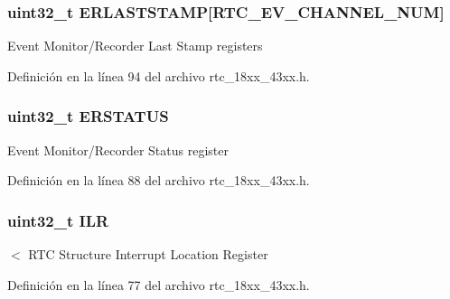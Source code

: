 \subsubsection[{\texorpdfstring{E\+R\+L\+A\+S\+T\+S\+T\+A\+MP}{ERLASTSTAMP}}]{ uint32\+\_\+t E\+R\+L\+A\+S\+T\+S\+T\+A\+MP\mbox{[}{\bf R\+T\+C\+\_\+\+E\+V\+\_\+\+C\+H\+A\+N\+N\+E\+L\+\_\+\+N\+UM}\mbox{]}}\hypertarget{struct_l_p_c___r_t_c___t_a1657c3a94cbbf1c7ecaa11f5ae2cfcc9}{}\label{struct_l_p_c___r_t_c___t_a1657c3a94cbbf1c7ecaa11f5ae2cfcc9}
Event Monitor/\+Recorder Last Stamp registers 

Definición en la línea 94 del archivo rtc\+\_\+18xx\+\_\+43xx.\+h.

\subsubsection[{\texorpdfstring{E\+R\+S\+T\+A\+T\+US}{ERSTATUS}}]{ uint32\+\_\+t E\+R\+S\+T\+A\+T\+US}\hypertarget{struct_l_p_c___r_t_c___t_a55a9999297cb6999d95700eb37d383d7}{}\label{struct_l_p_c___r_t_c___t_a55a9999297cb6999d95700eb37d383d7}
Event Monitor/\+Recorder Status register 

Definición en la línea 88 del archivo rtc\+\_\+18xx\+\_\+43xx.\+h.

\subsubsection[{\texorpdfstring{I\+LR}{ILR}}]{ uint32\+\_\+t I\+LR}\hypertarget{struct_l_p_c___r_t_c___t_a1a7a495de3dd80cbc190910e7a60cfdd}{}\label{struct_l_p_c___r_t_c___t_a1a7a495de3dd80cbc190910e7a60cfdd}
$<$ R\+TC Structure Interrupt Location Register 

Definición en la línea 77 del archivo rtc\+\_\+18xx\+\_\+43xx.\+h.

